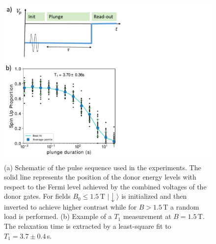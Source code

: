 \documentclass[%
 reprint,
 amsmath,amssymb,
 aps,
]{revtex4-1}
\newcommand {\ket} [1] {|{ #1 \rangle}}
\begin{document}
\begin{figure}
\centering
\includegraphics[width=\columnwidth]{fig2.pdf}
\caption{
(a) Schematic of the pulse sequence used in the experiments. The solid line represents the position of the donor energy levels with respect to the Fermi level achieved by the combined voltages of the donor gates. For fields $B_0\leq1.5\,$T $\ket{\downarrow}$ is initialized and then inverted to achieve higher contrast while for $B>1.5\,$T a random load is performed. (b) Example of a $T_1$ measurement at $B=1.5\,$T. The relaxation time is extracted by a least-square fit to $T_1=3.7\pm0.4\,$s.
}
\label{fig:t1example}
\end{figure}
\end{document}
